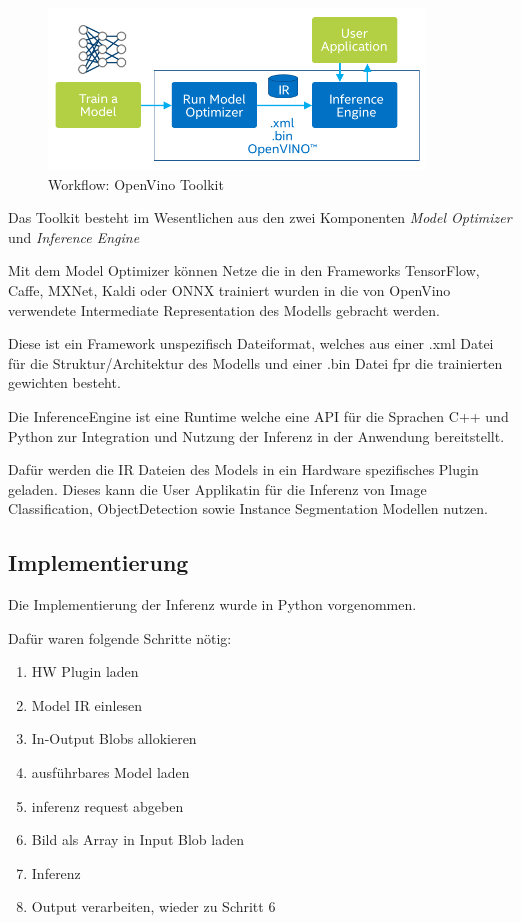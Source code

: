 \begin{figure}[htb]
    \centering
    \includegraphics[width=10cm]{./Bilder/open_vino_workflow_steps.png}
    \caption{Workflow: OpenVino Toolkit}
    \label{img:openvinoworkflow}
\end{figure}

Das Toolkit besteht im Wesentlichen aus den zwei Komponenten 
\textit{Model Optimizer} und \textit{Inference Engine}

Mit dem Model Optimizer können Netze die in den Frameworks 
TensorFlow, Caffe, MXNet, Kaldi oder ONNX trainiert wurden 
in die von OpenVino verwendete Intermediate Representation 
des Modells gebracht werden.

Diese ist ein Framework unspezifisch Dateiformat, welches aus 
einer .xml Datei für die Struktur/Architektur des Modells
und einer .bin Datei fpr die trainierten gewichten besteht.


Die InferenceEngine ist eine Runtime welche eine API für die 
Sprachen C++ und Python zur Integration und Nutzung der Inferenz 
in der Anwendung bereitstellt.

Dafür werden die IR Dateien des Models in ein Hardware spezifisches 
Plugin geladen. Dieses kann die User Applikatin für die Inferenz 
von Image Classification, ObjectDetection sowie Instance Segmentation
Modellen nutzen.



\subsection*{Implementierung}

Die Implementierung der Inferenz wurde in Python vorgenommen. 

Dafür waren folgende Schritte nötig:

 
\begin{enumerate}
    \item HW Plugin laden
    \item Model IR einlesen
    \item In-Output Blobs allokieren 
    \item ausführbares Model laden
    \item inferenz request abgeben
    \item Bild als Array in Input Blob laden
    \item Inferenz
    \item Output verarbeiten, wieder zu Schritt 6
\end{enumerate}


